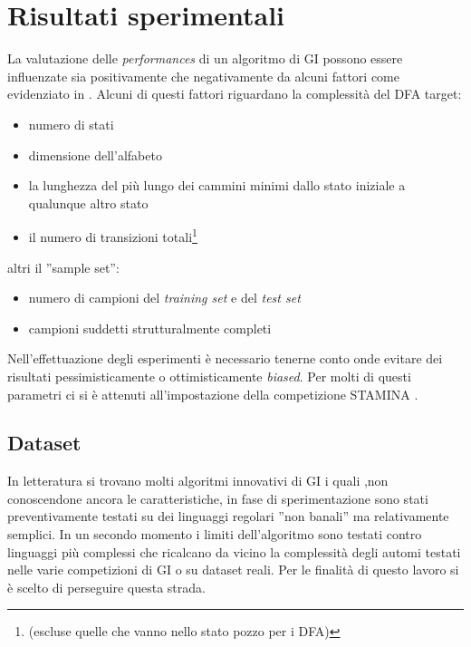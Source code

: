 \chapter{Risultati sperimentali} %
\label{cap:sette}
La valutazione delle \textit{performances} di un algoritmo di \ac{GI} possono essere influenzate sia positivamente che negativamente da alcuni fattori come  evidenziato in \cite{Stamina10}. Alcuni di questi fattori riguardano la complessità del \ac{DFA} target:
\begin{itemize}
\item numero di stati
\item dimensione dell'alfabeto
\item la lunghezza del più lungo dei cammini minimi dallo stato iniziale a qualunque altro stato
\item il numero di transizioni totali\footnote{ (escluse quelle che vanno nello stato pozzo per i \ac{DFA})}
\end{itemize}

altri il ''sample set'':
\begin{itemize}
\item numero di campioni del \textit{training set} e del \textit{test set}
\item campioni suddetti strutturalmente completi
\end{itemize} 
Nell'effettuazione degli esperimenti è necessario tenerne conto onde evitare dei risultati pessimisticamente o ottimisticamente \textit{biased}. Per molti di questi parametri ci si è attenuti all'impostazione della competizione STAMINA \cite{Stamina10}.

\section{Dataset}
In letteratura si trovano molti algoritmi innovativi di \ac{GI} i quali ,non conoscendone ancora le caratteristiche, in fase di sperimentazione  sono stati preventivamente testati su dei linguaggi regolari ''non banali'' ma relativamente semplici. In un secondo momento i limiti dell'algoritmo sono testati contro linguaggi più complessi che ricalcano da vicino la complessità degli automi testati nelle varie competizioni di \ac{GI} o su dataset reali. Per le finalità di questo lavoro si è scelto di perseguire questa strada.

